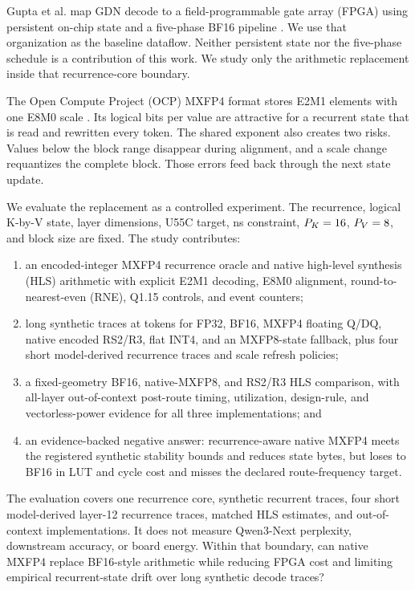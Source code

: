 \documentclass[conference]{IEEEtran}
\begin{document}
Gupta et al. map GDN decode to a field-programmable gate array (FPGA) using persistent on-chip state and a
five-phase BF16 pipeline \cite{gupta2026}. We use that organization as the
baseline dataflow. Neither persistent state nor the five-phase schedule is a
contribution of this work. We study only the arithmetic replacement inside that
recurrence-core boundary.

The Open Compute Project (OCP) MXFP4 format stores \CorrectedBlockSize{} E2M1
elements with one E8M0 scale
\cite{ocpmx}. Its \CorrectedMxfpFourLogicalBitsPerValue{} logical bits per value
are attractive for a recurrent
state that is read and rewritten every token. The shared exponent also creates
two risks. Values below the block range disappear during alignment, and a
scale change requantizes the complete block. Those errors feed back through
the next state update.

We evaluate the replacement as a controlled experiment. The recurrence,
logical K-by-V state, layer dimensions, U55C target,
\CorrectedTargetClockNs{} ns constraint, $P_K=16$,
$P_V=8$, and block size \CorrectedBlockSize{} are fixed. The study
contributes:

\begin{enumerate}
  \item an encoded-integer MXFP4 recurrence oracle and native high-level
        synthesis (HLS) arithmetic with explicit E2M1 decoding, E8M0 alignment,
        round-to-nearest-even (RNE), Q1.15 controls, and event counters;
  \item long synthetic traces at \CorrectedCheckpointSet{} tokens for
        FP32, BF16, MXFP4 floating Q/DQ, native encoded RS2/R3, flat INT4, and
        an MXFP8-state fallback, plus four short model-derived recurrence traces and
        \CorrectedScalePolicyCount{} scale
        refresh policies;
  \item a fixed-geometry BF16, native-MXFP8, and RS2/R3 HLS comparison, with
        all-layer out-of-context post-route timing, utilization, design-rule,
        and vectorless-power evidence for all three implementations; and
  \item an evidence-backed negative answer: recurrence-aware native MXFP4
        meets the registered synthetic stability bounds and reduces state
        bytes, but loses to BF16 in LUT and cycle cost and misses the declared
        route-frequency target.
\end{enumerate}

The evaluation covers one recurrence core, synthetic recurrent traces, four
short model-derived layer-12 recurrence traces, matched HLS estimates, and
out-of-context implementations. It does not measure Qwen3-Next
perplexity, downstream accuracy, or board energy. Within that boundary, can native MXFP4 replace BF16-style
arithmetic while reducing FPGA cost and limiting empirical recurrent-state
drift over long synthetic decode traces?
\end{document}
